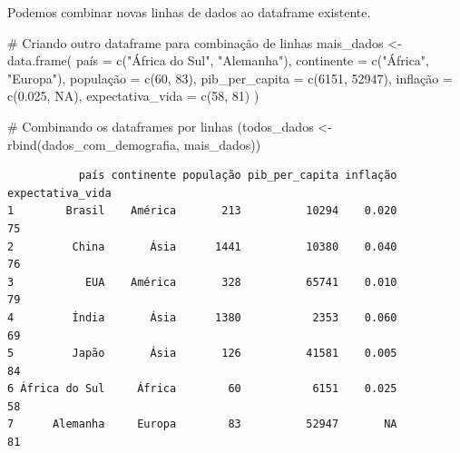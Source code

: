 \documentclass[
  portuguese,
  letterpaper,
  DIV=11,
  numbers=noendperiod]{scrreprt}
\newenvironment{Shaded}{\begin{snugshade}}{\end{snugshade}}
\newcommand{\AttributeTok}[1]{\textcolor[rgb]{0.40,0.45,0.13}{#1}}
\newcommand{\CommentTok}[1]{\textcolor[rgb]{0.37,0.37,0.37}{#1}}
\newcommand{\ConstantTok}[1]{\textcolor[rgb]{0.56,0.35,0.01}{#1}}
\newcommand{\DecValTok}[1]{\textcolor[rgb]{0.68,0.00,0.00}{#1}}
\newcommand{\FloatTok}[1]{\textcolor[rgb]{0.68,0.00,0.00}{#1}}
\newcommand{\FunctionTok}[1]{\textcolor[rgb]{0.28,0.35,0.67}{#1}}
\newcommand{\NormalTok}[1]{\textcolor[rgb]{0.00,0.23,0.31}{#1}}
\newcommand{\OtherTok}[1]{\textcolor[rgb]{0.00,0.23,0.31}{#1}}
\newcommand{\StringTok}[1]{\textcolor[rgb]{0.13,0.47,0.30}{#1}}
\theoremstyle{definition}
\theoremstyle{remark}
\begin{document}
Podemos combinar novas linhas de dados ao dataframe existente.

\begin{Shaded}
\begin{Highlighting}[]
\CommentTok{\# Criando outro dataframe para combinação de linhas}
\NormalTok{mais\_dados }\OtherTok{\textless{}{-}} \FunctionTok{data.frame}\NormalTok{(}
\NormalTok{  país }\OtherTok{=} \FunctionTok{c}\NormalTok{(}\StringTok{"África do Sul"}\NormalTok{, }\StringTok{"Alemanha"}\NormalTok{),}
  \AttributeTok{continente =} \FunctionTok{c}\NormalTok{(}\StringTok{"África"}\NormalTok{, }\StringTok{"Europa"}\NormalTok{),}
\NormalTok{  população }\OtherTok{=} \FunctionTok{c}\NormalTok{(}\DecValTok{60}\NormalTok{, }\DecValTok{83}\NormalTok{),}
  \AttributeTok{pib\_per\_capita =} \FunctionTok{c}\NormalTok{(}\DecValTok{6151}\NormalTok{, }\DecValTok{52947}\NormalTok{),}
\NormalTok{  inflação }\OtherTok{=} \FunctionTok{c}\NormalTok{(}\FloatTok{0.025}\NormalTok{, }\ConstantTok{NA}\NormalTok{),}
  \AttributeTok{expectativa\_vida =} \FunctionTok{c}\NormalTok{(}\DecValTok{58}\NormalTok{, }\DecValTok{81}\NormalTok{)}
\NormalTok{)}

\CommentTok{\# Combinando os dataframes por linhas}
\NormalTok{(todos\_dados }\OtherTok{\textless{}{-}} \FunctionTok{rbind}\NormalTok{(dados\_com\_demografia, mais\_dados))}
\end{Highlighting}
\end{Shaded}

\begin{verbatim}
           país continente população pib_per_capita inflação expectativa_vida
1        Brasil    América       213          10294    0.020               75
2         China       Ásia      1441          10380    0.040               76
3           EUA    América       328          65741    0.010               79
4         Índia       Ásia      1380           2353    0.060               69
5         Japão       Ásia       126          41581    0.005               84
6 África do Sul     África        60           6151    0.025               58
7      Alemanha     Europa        83          52947       NA               81
\end{verbatim}
\end{document}
